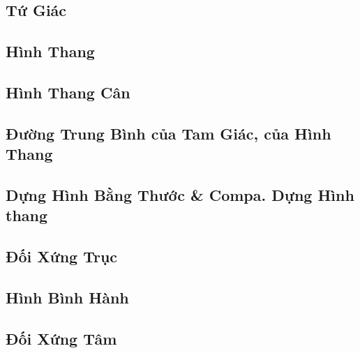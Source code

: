 \documentclass{article}
\numberwithin{equation}{section}
\begin{document}
\subsection{Tứ Giác}


\subsection{Hình Thang}


\subsection{Hình Thang Cân}


\subsection{Đường Trung Bình của Tam Giác, của Hình Thang}


\subsection{Dựng Hình Bằng Thước \& Compa. Dựng Hình thang}


\subsection{Đối Xứng Trục}


\subsection{Hình Bình Hành}


\subsection{Đối Xứng Tâm}
\end{document}
